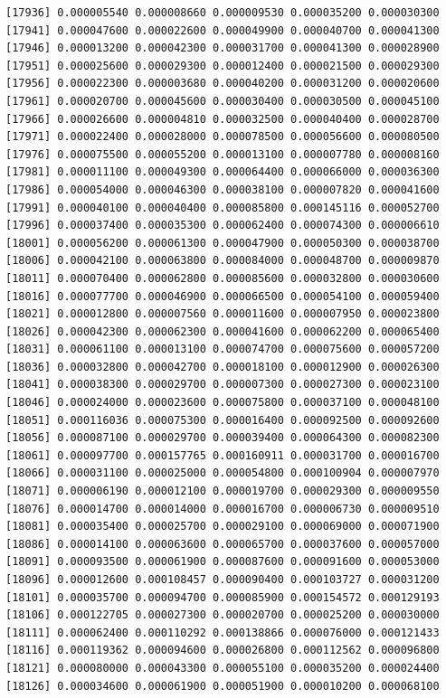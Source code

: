 \documentclass[]{article}
\begin{document}
\begin{verbatim}
[17936] 0.000005540 0.000008660 0.000009530 0.000035200 0.000030300
[17941] 0.000047600 0.000022600 0.000049900 0.000040700 0.000041300
[17946] 0.000013200 0.000042300 0.000031700 0.000041300 0.000028900
[17951] 0.000025600 0.000029300 0.000012400 0.000021500 0.000029300
[17956] 0.000022300 0.000003680 0.000040200 0.000031200 0.000020600
[17961] 0.000020700 0.000045600 0.000030400 0.000030500 0.000045100
[17966] 0.000026600 0.000004810 0.000032500 0.000040400 0.000028700
[17971] 0.000022400 0.000028000 0.000078500 0.000056600 0.000080500
[17976] 0.000075500 0.000055200 0.000013100 0.000007780 0.000008160
[17981] 0.000011100 0.000049300 0.000064400 0.000066000 0.000036300
[17986] 0.000054000 0.000046300 0.000038100 0.000007820 0.000041600
[17991] 0.000040100 0.000040400 0.000085800 0.000145116 0.000052700
[17996] 0.000037400 0.000035300 0.000062400 0.000074300 0.000006610
[18001] 0.000056200 0.000061300 0.000047900 0.000050300 0.000038700
[18006] 0.000042100 0.000063800 0.000084000 0.000048700 0.000009870
[18011] 0.000070400 0.000062800 0.000085600 0.000032800 0.000030600
[18016] 0.000077700 0.000046900 0.000066500 0.000054100 0.000059400
[18021] 0.000012800 0.000007560 0.000011600 0.000007950 0.000023800
[18026] 0.000042300 0.000062300 0.000041600 0.000062200 0.000065400
[18031] 0.000061100 0.000013100 0.000074700 0.000075600 0.000057200
[18036] 0.000032800 0.000042700 0.000018100 0.000012900 0.000026300
[18041] 0.000038300 0.000029700 0.000007300 0.000027300 0.000023100
[18046] 0.000024000 0.000023600 0.000075800 0.000037100 0.000048100
[18051] 0.000116036 0.000075300 0.000016400 0.000092500 0.000092600
[18056] 0.000087100 0.000029700 0.000039400 0.000064300 0.000082300
[18061] 0.000097700 0.000157765 0.000160911 0.000031700 0.000016700
[18066] 0.000031100 0.000025000 0.000054800 0.000100904 0.000007970
[18071] 0.000006190 0.000012100 0.000019700 0.000029300 0.000009550
[18076] 0.000014700 0.000014000 0.000016700 0.000006730 0.000009510
[18081] 0.000035400 0.000025700 0.000029100 0.000069000 0.000071900
[18086] 0.000014100 0.000063600 0.000065700 0.000037600 0.000057000
[18091] 0.000093500 0.000061900 0.000087600 0.000091600 0.000053000
[18096] 0.000012600 0.000108457 0.000090400 0.000103727 0.000031200
[18101] 0.000035700 0.000094700 0.000085900 0.000154572 0.000129193
[18106] 0.000122705 0.000027300 0.000020700 0.000025200 0.000030000
[18111] 0.000062400 0.000110292 0.000138866 0.000076000 0.000121433
[18116] 0.000119362 0.000094600 0.000026800 0.000112562 0.000096800
[18121] 0.000080000 0.000043300 0.000055100 0.000035200 0.000024400
[18126] 0.000034600 0.000061900 0.000051900 0.000010200 0.000068100

\end{verbatim}
\end{document}
